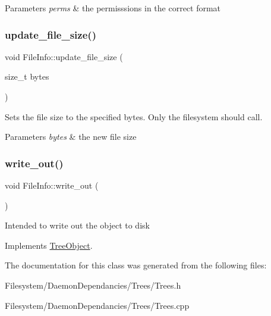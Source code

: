 \begin{DoxyParams}{Parameters}
{\em perms} & the permisssions in the correct format \\
\hline
\end{DoxyParams}
\mbox{\label{classFileInfo_a3c548a8dfcb6530bfef7551ac24ca473}} 
\subsubsection{\texorpdfstring{update\+\_\+file\+\_\+size()}{update\_file\_size()}}
{\footnotesize\ttfamily void File\+Info\+::update\+\_\+file\+\_\+size (\begin{DoxyParamCaption}\item[{size\+\_\+t}]{bytes }\end{DoxyParamCaption})}

Sets the file size to the specified bytes. Only the filesystem should call. 
\begin{DoxyParams}{Parameters}
{\em bytes} & the new file size \\
\hline
\end{DoxyParams}
\mbox{\label{classFileInfo_a8e835f000ddfd0f1097ccfa7e7801a09}} 
\subsubsection{\texorpdfstring{write\+\_\+out()}{write\_out()}}
{\footnotesize\ttfamily void File\+Info\+::write\+\_\+out (\begin{DoxyParamCaption}{ }\end{DoxyParamCaption})\hspace{0.3cm}{\ttfamily [virtual]}}

Intended to write out the object to disk 

Implements \mbox{\hyperlink{classTreeObject_a63708d61353d83e3e03597394bb7aca0}{Tree\+Object}}.



The documentation for this class was generated from the following files\+:\begin{DoxyCompactItemize}
\item 
Filesystem/\+Daemon\+Dependancies/\+Trees/Trees.\+h\item 
Filesystem/\+Daemon\+Dependancies/\+Trees/Trees.\+cpp\end{DoxyCompactItemize}
